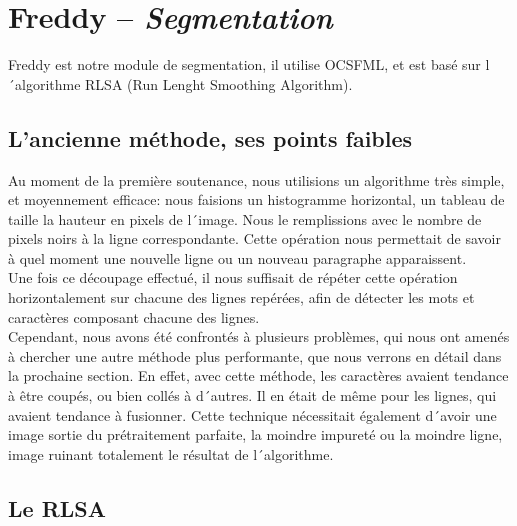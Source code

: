 \chapter{Freddy -- \emph{Segmentation}}

Freddy est notre module de segmentation, il utilise OCSFML, et est basé sur l´algorithme RLSA (Run Lenght Smoothing Algorithm).

\section{L'ancienne méthode, ses points faibles}

Au moment de la première soutenance, nous utilisions un algorithme très simple, et moyennement efficace: nous faisions un histogramme horizontal, un tableau de taille la hauteur en pixels de l´image. Nous le remplissions avec le nombre de pixels noirs à la ligne correspondante. Cette opération nous permettait de savoir à quel moment une nouvelle ligne ou un nouveau paragraphe apparaissent.\\
Une fois ce découpage effectué, il nous suffisait de répéter cette opération horizontalement sur chacune des lignes repérées, afin de détecter les mots et caractères composant chacune des lignes.\\
Cependant, nous avons été confrontés à plusieurs problèmes, qui nous ont amenés à chercher une autre méthode plus performante, que nous verrons en détail dans la prochaine section. En effet, avec cette méthode, les caractères avaient tendance à être coupés, ou bien collés à d´autres. Il en était de même pour les lignes, qui avaient tendance à fusionner. Cette technique nécessitait également d´avoir une image sortie du prétraitement parfaite, la moindre impureté ou la moindre ligne, image ruinant totalement le résultat de l´algorithme.


\section{Le RLSA}

